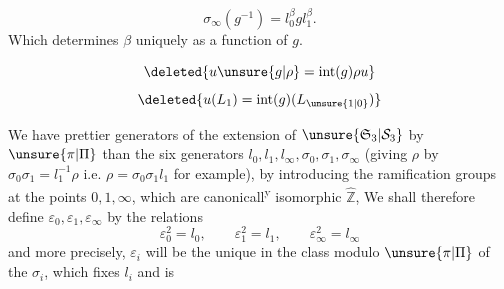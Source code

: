 \[
\sigma_\infty(g^{-1})=l_0^\beta g l_1^\beta.
\]
Which determines $\beta$ uniquely as a function of $g$.

\[
\deleted{\displaystyle u\unsure{g|\rho}=\operatorname{int}(g)\rho u}
\]
\[
\deleted{\displaystyle u(L_1)=\operatorname{int}(g)(L_{\unsure{1|0}})}
\]

We have prettier generators of the extension of $\unsure{\mathfrak S_3|\mathcal S_3}$ by $\unsure{\pi|\Pi}$  than the six generators $l_0,l_1,l_\infty,\sigma_0,\sigma_1,\sigma_\infty$ (giving $\rho$ by $\sigma_0\sigma_1=l_1^{-1}\rho$  i.e. $\rho=\sigma_0\sigma_1l_1$ for example), by introducing the ramification groups at the points $0,1,\infty$, which are canonicall\textsuperscript{y} isomorphic  $\widehat{\mathbb Z}$,
We shall therefore define $\varepsilon_0,\varepsilon_1,\varepsilon_\infty$ by the relations
\[
\varepsilon_0^2=l_0,\qquad\varepsilon_1^2=l_1,\qquad\varepsilon_\infty^2=l_\infty
\]
and more precisely, $\varepsilon_i$ will be the unique   in the class modulo $\unsure{\pi|\Pi}$ of the $\sigma_i$,  which fixes $l_i$ and is  
